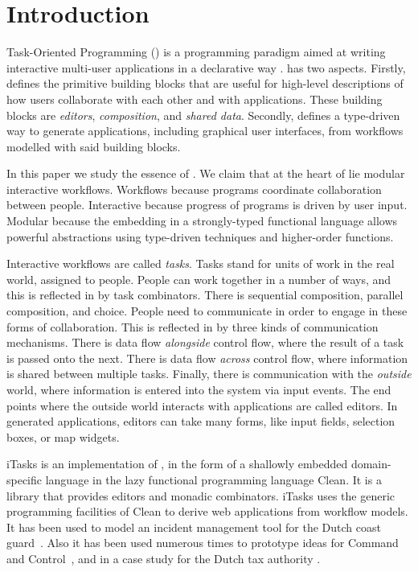 


\section{Introduction}

Task-Oriented Programming (\TOP) is a programming paradigm aimed at writing interactive multi-user applications in a declarative way \cite{conf/ppdp/PlasmeijerLMAK12}.
\TOP has two aspects.
Firstly, \TOP defines the primitive building blocks that are useful for high-level descriptions of how users collaborate with each other and with applications.
These building blocks are \emph{editors}, \emph{composition}, and \emph{shared data}.
Secondly, \TOP defines a type-driven way to generate applications, including graphical user interfaces, from workflows modelled with said building blocks.

In this paper we study the essence of \TOP.
We claim that at the heart of \TOP lie modular interactive workflows.
Workflows because \TOP programs coordinate collaboration between people.
Interactive because progress of \TOP programs is driven by user input.
Modular because the embedding in a strongly-typed functional language allows powerful abstractions using type-driven techniques and higher-order functions.

Interactive workflows are called \emph{tasks}.
Tasks stand for units of work in the real world, assigned to people.
People can work together in a number of ways, and this is reflected in \TOP by task combinators.
There is sequential composition, parallel composition, and choice.
People need to communicate in order to engage in these forms of collaboration.
This is reflected in \TOP by three kinds of communication mechanisms.
There is data flow \emph{alongside} control flow, where the result of a task is passed onto the next.
There is data flow \emph{across} control flow, where information is shared between multiple tasks.
Finally, there is communication with the \emph{outside} world, where information is entered into the system via input events.
The end points where the outside world interacts with \TOP applications are called editors.
In generated applications, editors can take many forms, like input fields, selection boxes, or map widgets.

iTasks is an implementation of \TOP, in the form of a shallowly embedded domain-specific language in the lazy functional programming language Clean.
It is a library that provides editors and monadic combinators.
iTasks uses the generic programming facilities of Clean to derive web applications from workflow models.
It has been used to model an incident management tool for the Dutch coast guard~\cite{conf/iscram/LijnseJP12}.
Also it has been used numerous times to prototype ideas for Command and Control~\cite{theses/nlda/Kool17, theses/radboud/Stutterheim17}, and in a case study for the Dutch tax authority \cite{conf/sfp/StutterheimAP17}.
